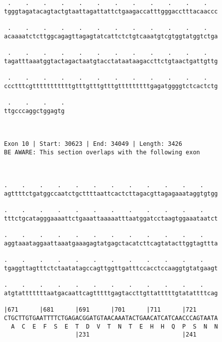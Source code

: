 \documentclass{article}
\begin{document}
\begin{Verbatim}
 .    .    .    .    .    .    .    .    .    .    .    .   
tgggtagatacagtactgtaattagattattctgaagaccatttgggacctttacaaccc
                                                            
 .    .    .    .    .    .    .    .    .    .    .    .   
acaaaatctcttggcagagttagagtatcattctctgtcaaatgtcgtggtatggtctga
                                                            
 .    .    .    .    .    .    .    .    .    .    .    .   
tagatttaaatggtactagactaatgtacctataataagaccttctgtaactgattgttg
                                                            
 .    .    .    .    .    .    .    .    .    .    .    .   
ccctttcgtttttttttttgtttgtttgtttgtttttttttgagatggggtctcactctg
                                                            
 .    .    .    .
ttgcccaggctggagtg
                 
                 
 
Exon 10 | Start: 30623 | End: 34049 | Length: 3426
BE AWARE: This section overlaps with the following exon



.    .    .    .    .    .    .    .    .    .    .    .    
agttttctgatggccaatctgcttttaattcactcttagacgttagagaaataggtgtgg
                                                            
.    .    .    .    .    .    .    .    .    .    .    .    
tttctgcatagggaaaattctgaaattaaaaatttaatggatcctaagtggaaataatct
                                                            
.    .    .    .    .    .    .    .    .    .    .    .    
aggtaaataggaattaaatgaaagagtatgagctacatcttcagtatacttggtagttta
                                                            
.    .    .    .    .    .    .    .    .    .    .    .    
tgaggttagtttctctaatatagccagttggttgatttccacctccaaggtgtatgaagt
                                                            
.    .    .    .    .    .    .    .    .    .    .    .    
atgtatttttttaatgacaattcagtttttgagtaccttgttatttttgtatattttcag
                                                            
|671      |681      |691      |701      |711      |721      
CTGCTTGTGAATTTTCTGAGACGGATGTAACAAATACTGAACATCATCAACCCAGTAATA
  A  C  E  F  S  E  T  D  V  T  N  T  E  H  H  Q  P  S  N  N
                    |231                          |241      
  

\end{Verbatim}
\end{document}
